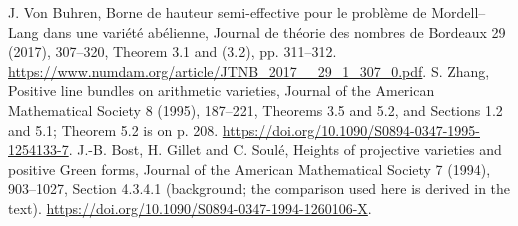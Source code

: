 J. Von Buhren, Borne de hauteur semi-effective pour le probl\`eme de
Mordell--Lang dans une vari\'et\'e ab\'elienne,
Journal de th\'eorie des nombres de Bordeaux 29 (2017), 307--320,
Theorem 3.1 and (3.2), pp. 311--312.
\url{https://www.numdam.org/article/JTNB_2017__29_1_307_0.pdf}.
S. Zhang, Positive line bundles on arithmetic varieties,
Journal of the American Mathematical Society 8 (1995), 187--221,
Theorems 3.5 and 5.2, and Sections 1.2 and 5.1; Theorem 5.2 is on p. 208.
\url{https://doi.org/10.1090/S0894-0347-1995-1254133-7}.
J.-B. Bost, H. Gillet and C. Soul\'e,
Heights of projective varieties and positive Green forms,
Journal of the American Mathematical Society 7 (1994), 903--1027,
Section 4.3.4.1 (background; the comparison used here is derived in the text).
\url{https://doi.org/10.1090/S0894-0347-1994-1260106-X}.
